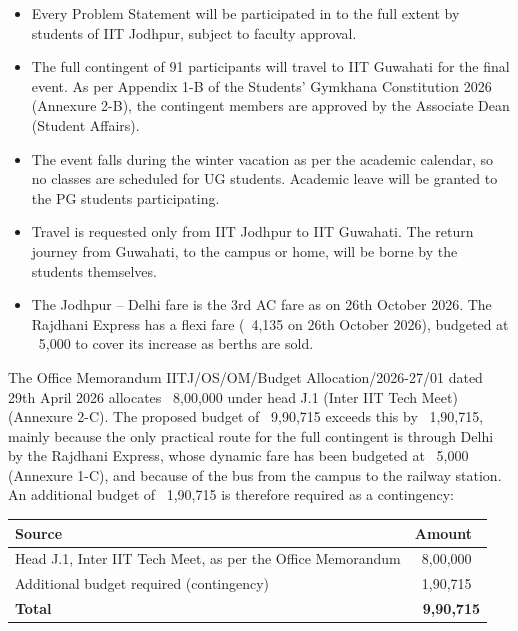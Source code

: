 \documentclass[11pt,letterpaper]{article}
\newcommand{\rs}{{\rupee}}
\newcommand{\subhead}[1]{\par\needspace{6\baselineskip}{\bfseries #1}\par\nopagebreak}
\begin{document}
\begin{itemize}
  \item Every Problem Statement will be participated in to the full extent by students of IIT Jodhpur, subject to faculty approval.
  \item The full contingent of 91 participants will travel to IIT Guwahati for the final event. As per Appendix 1-B of the Students' Gymkhana Constitution 2026 (Annexure 2-B), the contingent members are approved by the Associate Dean (Student Affairs).
  \item The event falls during the winter vacation as per the academic calendar, so no classes are scheduled for UG students. Academic leave will be granted to the PG students participating.
  \item Travel is requested only from IIT Jodhpur to IIT Guwahati. The return journey from Guwahati, to the campus or home, will be borne by the students themselves.
  \item The Jodhpur -- Delhi fare is the 3rd AC fare as on 26th October 2026. The Rajdhani Express has a flexi fare (\rs~4,135 on 26th October 2026), budgeted at \rs~5,000 to cover its increase as berths are sold.
\end{itemize}

\subhead{Funding of the budget}
The Office Memorandum IITJ/OS/OM/Budget Allocation/2026-27/01 dated 29th April 2026 allocates \rs~8,00,000 under head J.1 (Inter IIT Tech Meet) (Annexure 2-C). The proposed budget of \rs~9,90,715 exceeds this by \rs~1,90,715, mainly because the only practical route for the full contingent is through Delhi by the Rajdhani Express, whose dynamic fare has been budgeted at \rs~5,000 (Annexure 1-C), and because of the bus from the campus to the railway station.
An additional budget of \rs~1,90,715 is therefore required as a contingency:

\begin{center}
\begin{tabular}{|L{8.4cm}|R{2.8cm}|}
\hline
\textbf{Source} & \textbf{Amount} \\ \hline
Head J.1, Inter IIT Tech Meet, as per the Office Memorandum & \rs~8,00,000 \\ \hline
Additional budget required (contingency) & \rs~1,90,715 \\ \hline
\textbf{Total} & \textbf{\rs~9,90,715} \\ \hline
\end{tabular}
\end{center}
\end{document}
